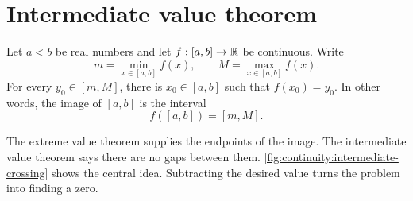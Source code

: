 \section{Intermediate value theorem}
\label{sec:analysis-i:intermediate-value-theorem}

\begin{theorem}
  \label{thm:analysis-i:intermediate-value}
  Let $a<b$ be real numbers and let $f:[a,b]\to\mathbb{R}$ be continuous.
  Write
  \[
    m=\min_{x\in[a,b]}f(x),\qquad
    M=\max_{x\in[a,b]}f(x).
  \]
  For every $y_0\in[m,M]$, there is $x_0\in[a,b]$ such that
  $f(x_0)=y_0$. In other words, the image of $[a,b]$ is the interval
  \[
    f([a,b])=[m,M].
  \]
\end{theorem}


  The extreme value theorem supplies the endpoints of the image. The
  intermediate value theorem says there are no gaps between them.
  \autoref{fig:continuity:intermediate-crossing} shows the central idea.
  Subtracting the desired value turns the problem into finding a zero.

\begin{marginfigure}
  \centering
  
  \caption[A crossing of an intermediate level.]{Schematic
    continuous graph. A level $y_0$ between the extreme values is reached
    at some $x_0$. For $g=f-y_0$, that point is a zero.}
  \label{fig:continuity:intermediate-crossing}
\end{marginfigure}

